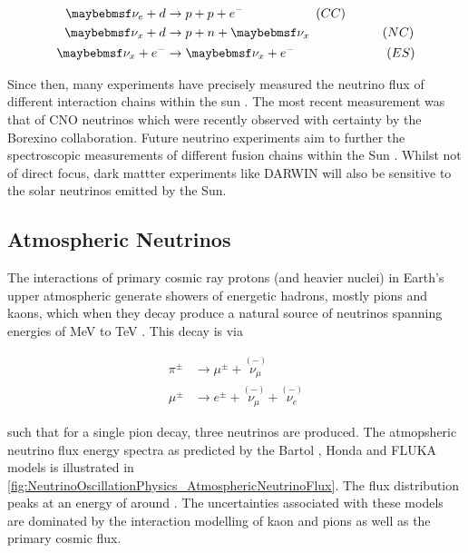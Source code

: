 \begin{equation}
  \label{eq:NeutrinoOscillationPhysics_SNOInteractions}
  \begin{split}
    \nu_{e} + d &\rightarrow p + p + e^{-} \hspace{2cm} (CC) \\
    \nu_{x} + d &\rightarrow p + n + \nu_{x} \hspace{2.02cm} (NC) \\
    \nu_{x} + e^{-} &\rightarrow \nu_{x} + e^{-} \hspace{2.55cm} (ES)
  \end{split}
\end{equation}

Since then, many experiments have precisely measured the neutrino flux of different interaction chains within the sun \cite{Borexino_Collaboration2018-of, Aharmim2006-yb, Agostini2020-so}. The most recent measurement was that of CNO neutrinos which were recently observed with \quickmath{5\sigma} certainty by the Borexino collaboration. Future neutrino experiments aim to further the spectroscopic measurements of different fusion chains within the Sun \cite{Andringa2016-zd, Beacom2017-ff, An2016-gm}. Whilst not of direct focus, dark mattter experiments like DARWIN \cite{aalbers2020solar} will also be sensitive to the solar neutrinos emitted by the Sun.

\subsection{Atmospheric Neutrinos}
\label{subsec:NeutrinoOscillationPhysics_AtmosphericNeutrinos}

The interactions of primary cosmic ray protons (and heavier nuclei) in Earth's upper atmospheric generate showers of energetic hadrons, mostly pions and kaons, which when they decay produce a natural source of neutrinos spanning energies of MeV to TeV \cite{Gaisser2002-gl}. This decay is via

\begin{equation}
  \label{eq:NeutrinoOscillationPhysics_PionDecay}
  \begin{split}
    \pi^{\pm} &\rightarrow \mu^{\pm} + \overset{(-)}{\nu_{\mu}} \\
    \mu^{\pm} &\rightarrow e^{\pm} + \overset{(-)}{\nu_{\mu}} + \overset{(-)}{\nu_{e}}
  \end{split}
\end{equation}

such that for a single pion decay, three neutrinos are produced. The atmopsheric neutrino flux energy spectra as predicted by the Bartol \cite{Barr_2004}, Honda \cite{Honda_2007, PhysRevD.70.043008} and FLUKA \cite{etde_20239111} models is illustrated in \autoref{fig:NeutrinoOscillationPhysics_AtmosphericNeutrinoFlux}. The flux distribution peaks at an energy of around . The uncertainties associated with these models are dominated by the interaction modelling of kaon and pions as well as the primary cosmic flux. 

